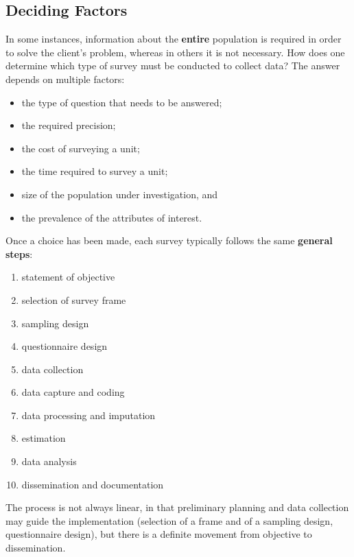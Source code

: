 \subsection{Deciding Factors} In some instances, information about the \textbf{entire} population is required in order to solve the client's problem, whereas in others it is not necessary.  How does one determine which type of survey must be conducted to collect data? The answer depends on multiple factors: 
\begin{itemize}[noitemsep]
    \item the type of question that needs to be answered;
\item the required precision;
\item the cost of surveying a unit;
\item the time required to survey a unit; \item size of the population under investigation, and 
\item the prevalence of the attributes of interest.
\end{itemize}
Once a choice has been made, each survey typically follows the same \textbf{general steps}:
\begin{enumerate}[noitemsep]
    \item statement of objective
    \item selection of survey frame
    \item sampling design
    \item questionnaire design
    \item data collection
    \item data capture and coding
    \item data processing and imputation
    \item estimation
    \item data analysis
    \item dissemination and  documentation
\end{enumerate}
The process is not always linear, in that preliminary planning and data collection may guide the implementation (selection of a frame and of a sampling design, questionnaire design), but there is a definite movement from objective to dissemination.   
